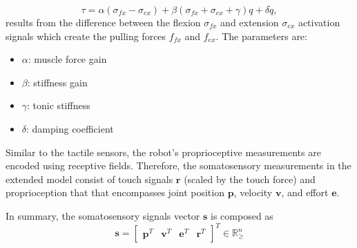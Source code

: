 \begin{equation}\label{eq:antagonistic_torque}
	\tau = \alpha \left(\sigma_{fx} - \sigma_{ex}\right)  + \beta \left(\sigma_{fx} + \sigma_{ex} + \gamma \right) q + \delta \dot{q},
\end{equation}
results from the difference between the flexion $ \sigma_{fx} $ and  extension $\sigma_{ex}$ activation signals which create the pulling forces $ f_{fx}$ and $f_{ex} $. The parameters are:
\begin{itemize}
	\item $\alpha$: muscle force gain
	\item $\beta$: stiffness gain
	\item $\gamma$: tonic stiffness	
	\item $\delta$: damping coefficient
\end{itemize}

Similar to the tactile sensors, the robot's proprioceptive measurements are encoded using receptive fields. Therefore, the somatosensory measurements in the extended model consist of touch signals $\bm{r}$ (scaled by the touch force) and proprioception that that encompasses joint position $\bm{p}$, velocity $\bm{v}$, and effort $\bm{e}$.

In summary, the somatosensory signals vector $\bm{s}$ is composed as 
\begin{equation}
	\bm{s} = \begin{bmatrix}
		\bm{p}^T & \bm{v}^T & \bm{e}^T & \bm{r}^T
	\end{bmatrix}^T \in \mathbb{R}^n_{\geq}
\end{equation}

